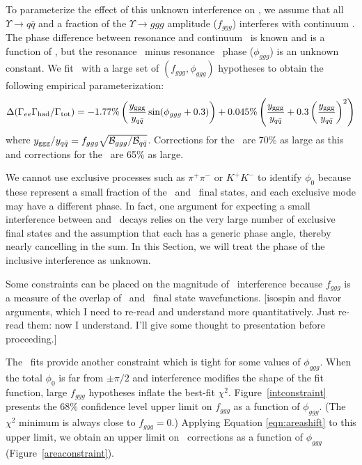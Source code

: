 \documentclass{cornell}
\begin{document}
To parameterize the effect of this unknown interference on \geehadtot,
we assume that all $\Upsilon \to q\bar{q}$ and a fraction of the
$\Upsilon \to ggg$ amplitude ($f_{ggg}$) interferes with continuum
\qqbar.  The phase difference between resonance and continuum \qqbar\
is known and is a function of \ecm, but the resonance \ggg\ minus
resonance \qqbar\ phase ($\phi_{ggg}$) is an unknown constant.  We fit
\us\ with a large set of $(f_{ggg}, \phi_{ggg})$ hypotheses to obtain
the following empirical parameterization:
\begin{equation}
  \Delta(\Gamma_{ee}\Gamma_{\mbox{\scriptsize had}}/\Gamma_{\mbox{\scriptsize tot}}) = -1.77\% \left(\frac{y_{\mbox{\scriptsize ggg}}}{y_{q\bar{q}}} \sin(\phi_{ggg} + 0.3) \right)
  + 0.045\% \left(\frac{y_{\mbox{\scriptsize ggg}}}{y_{q\bar{q}}} + 0.3 \left(\frac{y_{\mbox{\scriptsize ggg}}}{y_{q\bar{q}}}\right)^2 \right)
  \label{eqn:areashift}
\end{equation}
where $y_{\mbox{\scriptsize ggg}}/y_{q\bar{q}} = f_{ggg}\sqrt{{\mathcal
B}_{ggg}/{\mathcal B}_{q\bar{q}}}$.  Corrections for the \uss\ are
70\% as large as this and corrections for the \usss\ are 65\% as
large.

We cannot use exclusive processes such as $\pi^+\pi^-$ or $K^+K^-$ to
identify $\phi_0$ because these represent a small fraction of the
\qqbar\ and \ggg\ final states, and each exclusive mode may have a
different phase.  In fact, one argument for expecting a small
interference between \qqbar and \ggg\ decays relies on the very large
number of exclusive final states and the assumption that each has a
generic phase angle, thereby nearly cancelling in the sum.  In this
Section, we will treat the phase of the inclusive interference as
unknown.

Some constraints can be placed on the magnitude of \ggg\ interference
because $f_{ggg}$ is a measure of the overlap of \ggg\ and \qqbar\
final state wavefunctions.  [isospin and flavor arguments, which I
need to re-read and understand more quantitatively.  Just re-read
them: now I understand.  I'll give some thought to presentation before
proceeding.]

The \us\ fits provide another constraint which is tight for some
values of $\phi_{ggg}$.  When the total $\phi_0$ is far from
$\pm\pi/2$ and interference modifies the shape of the fit function,
large $f_{ggg}$ hypotheses inflate the best-fit $\chi^2$.  Figure~\ref{intconstraint} presents the 68\% confidence level upper limit on
$f_{ggg}$ as a function of $\phi_{ggg}$.  (The $\chi^2$ minimum is
always close to $f_{ggg} = 0$.)  Applying Equation \ref{eqn:areashift}
to this upper limit, we obtain an upper limit on \geehadtot\
corrections as a function of $\phi_{ggg}$ (Figure~\ref{areaconstraint}).
\end{document}
